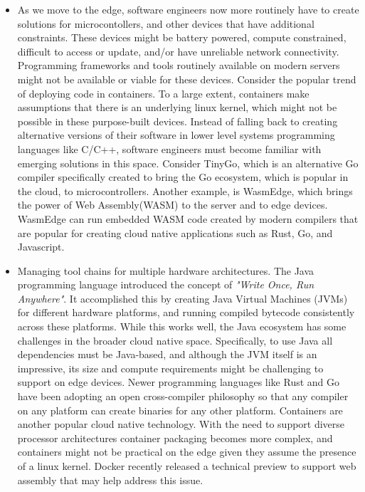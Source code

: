 \documentclass[conference]{IEEEtran}
\begin{document}
\begin{itemize}
	\item As we move to the edge, software engineers now more routinely have to create solutions for microcontollers, and other devices that have additional constraints.  These devices might be battery powered, compute constrained, difficult to access or update, and/or have unreliable network connectivity. Programming frameworks and tools routinely available on modern servers might not be available or viable for these devices.  Consider the popular trend of deploying code in containers.  To a large extent, containers make assumptions that there is an underlying linux kernel, which might not be possible in these purpose-built devices. Instead of falling back to creating alternative versions of their software in lower level systems programming languages like C/C++, software engineers must become familiar with emerging solutions in this space.  Consider TinyGo\cite{TinyGo}, which is an alternative Go compiler specifically created to bring the Go ecosystem, which is popular in the cloud, to microcontrollers.  Another example, is WasmEdge\cite{WASMEdge}, which brings the power of Web Assembly(WASM) to the server and to edge devices.  WasmEdge can run embedded WASM code created by modern compilers that are popular for creating cloud native applications such as Rust, Go, and Javascript.       
	
	\item Managing tool chains for multiple hardware architectures.  The Java programming language introduced the concept of \textit{"Write Once, Run Anywhere"}. It accomplished this by creating Java Virtual Machines (JVMs) for different hardware platforms, and running compiled bytecode consistently across these platforms.  While this works well, the Java ecosystem has some challenges in the broader cloud native space.  Specifically, to use Java all dependencies must be Java-based, and although the JVM itself is an impressive, its size and compute requirements might be challenging to support on edge devices. Newer programming languages like Rust and Go have been adopting an open cross-compiler philosophy so that any compiler on any platform can create binaries for any other platform.  Containers are another popular cloud native technology.  With the need to support diverse processor architectures container packaging becomes more complex, and containers might not be practical on the edge given they assume the presence of a linux kernel.  Docker recently released a technical preview to support web assembly that may help address this issue\cite{DockerWASM}.
\end{itemize}
 
\end{document}

